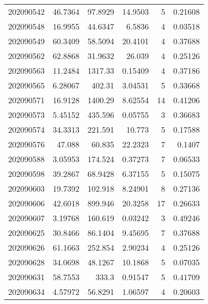 \begin{tabular}{rrrrrr}
 202090542 &         46.7364  &       97.8929 &           14.9503  &           5 & 0.21608 \\
 202090548 &         16.9955  &       44.6347 &            6.5836  &           4 & 0.03518 \\
 202090549 &         60.3409  &       58.5094 &           20.4101  &           4 & 0.37688 \\
 202090562 &         62.8868  &       31.9632 &           26.039   &           4 & 0.25126 \\
 202090563 &         11.2484  &     1317.33   &            0.15409 &           4 & 0.37186 \\
 202090565 &          6.28067 &      402.31   &            3.04531 &           5 & 0.33668 \\
 202090571 &         16.9128  &     1400.29   &            8.62554 &          14 & 0.41206 \\
 202090573 &          5.45152 &      435.596  &            0.05755 &           3 & 0.36683 \\
 202090574 &         34.3313  &      221.591  &           10.773   &           5 & 0.17588 \\
 202090576 &         47.088   &       60.835  &           22.2323  &           7 & 0.1407  \\
 202090588 &          3.05953 &      174.524  &            0.37273 &           7 & 0.06533 \\
 202090598 &         39.2867  &       68.9428 &            6.37155 &           5 & 0.15075 \\
 202090603 &         19.7392  &      102.918  &            8.24901 &           8 & 0.27136 \\
 202090606 &         42.6018  &      899.946  &           20.3258  &          17 & 0.26633 \\
 202090607 &          3.19768 &      160.619  &            0.03242 &           3 & 0.49246 \\
 202090625 &         30.8466  &       86.1404 &            9.45695 &           7 & 0.37688 \\
 202090626 &         61.1663  &      252.854  &            2.90234 &           4 & 0.25126 \\
 202090628 &         34.0698  &       48.1267 &           10.1868  &           5 & 0.07035 \\
 202090631 &         58.7553  &      333.3    &            0.91547 &           5 & 0.41709 \\
 202090634 &          4.57972 &       56.8291 &            1.06597 &           4 & 0.20603 \\

\end{tabular}
